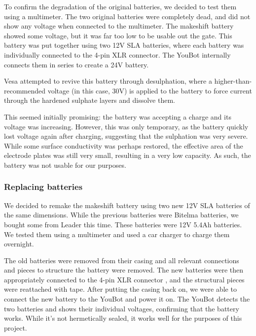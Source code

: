 \documentclass[a4paper, 12pt]{article}
\newif\ifshownotes
\newcommand{\notes}[1]{\ifshownotes\textcolor{blue}{#1}\fi}
\begin{document}
    To confirm the degradation of the original batteries, we decided to test them using a multimeter. The two original batteries were completely dead, and did not show any voltage when connected to the multimeter. The makeshift battery showed some voltage, but it was far too low to be usable out the gate. This battery was put together using two 12V SLA batteries, where each battery was individually connected to the 4-pin XLR connector. The YouBot internally connects them in series to create a 24V battery.   
    
    Vesa attempted to revive this battery through desulphation, where a higher-than-recommended voltage (in this case, 30V) is applied to the battery to force current through the hardened sulphate layers and dissolve them. 

    This seemed initially promising: the battery was accepting a charge and its voltage was increasing. However, this was only temporary, as the battery quickly lost voltage again after charging, suggesting that the sulphation was very severe. While some surface conductivity was perhaps restored, the effective area of the electrode plates was still very small, resulting in a very low capacity. As such, the battery was not usable for our purposes.  

    \subsubsection{Replacing batteries}

    \notes{maybe here we can link to the specific batteries used? the dimensions would be neat as well...}

    We decided to remake the makeshift battery using two new 12V SLA batteries of the same dimensions. While the previous batteries were Bitelma batteries, we bought some from Leader this time. These batteries were 12V 5.4Ah batteries. We tested them using a multimeter and used a car charger to charge them overnight. 
    
    The old batteries were removed from their casing and all relevant connections and pieces to structure the battery were removed. The new batteries were then appropriately connected to the 4-pin XLR connector \notes{maybe mention the pinout here?}, and the structural pieces were reattached with tape. After putting the casing back on, we were able to connect the new battery to the YouBot and power it on. The YouBot detects the two batteries and shows their individual voltages, confirming that the battery works. While it's not hermetically sealed, it works well for the purposes of this project. 
\end{document}

